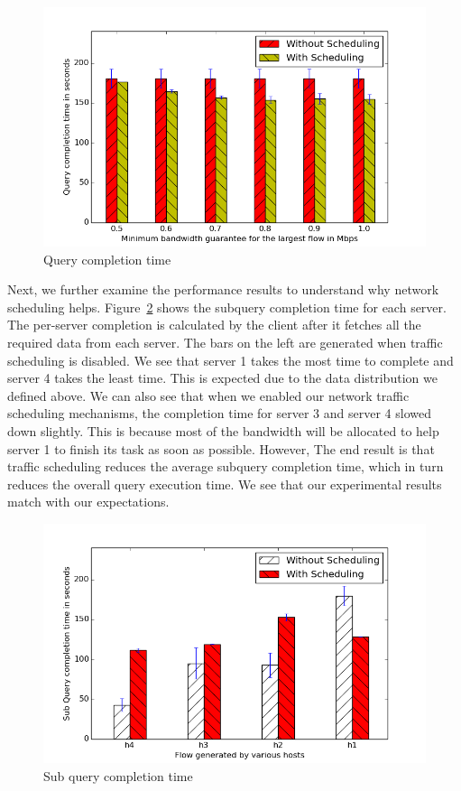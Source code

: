 \documentclass{sig-alternate-2013}
\begin{document}
\begin{figure}
    \centering
    \includegraphics[scale=0.47]{figures/simple_topo_overall.png}
    \caption{Query completion time}\label{fig:micro_benchmark_total_time}
\end{figure}

Next, we further examine the performance results to understand why network scheduling helps.
Figure~\ref{fig:sub_query_completion_8} shows the subquery completion time for each server.
The per-server completion is calculated by the client after it fetches all the required data from each server.
The bars on the left are generated when traffic scheduling is disabled.
We see that server 1 takes the most time to complete and server 4 takes the least time.
This is expected due to the data distribution we defined above.
We can also see that when we enabled our network traffic scheduling mechanisms, the completion time for server 3 and server 4 slowed down slightly.
This is because most of the bandwidth will be allocated to help server 1 to finish its task as soon as possible.
However, The end result is that traffic scheduling reduces the average subquery completion time, which in turn reduces the overall query execution time.
We see that our experimental results match with our expectations.

\begin{figure}
    \centering
    \includegraphics[scale=0.47]{figures/simple_topo_closer_8.png}
    \caption{Sub query completion time}\label{fig:sub_query_completion_8}
\end{figure}
\end{document}
